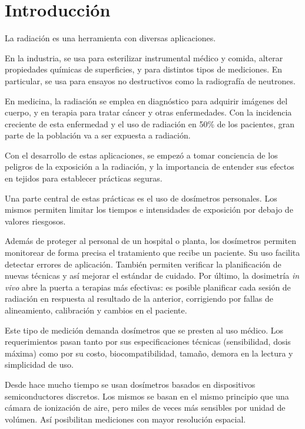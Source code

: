 \section{Introducción}
La radiación es una herramienta con diversas aplicaciones.

En la industria, se usa para esterilizar instrumental médico y comida,
alterar propiedades químicas de superficies\cite{clough2001high},
y para distintos tipos de mediciones.
En particular, se usa para ensayos no destructivos
como la radiografía de neutrones\cite{berger_neutron_1960}.

En medicina, la radiación se emplea en diagnóstico para adquirir imágenes del cuerpo,
y en terapia para tratar cáncer y otras enfermedades.
Con la incidencia creciente de esta enfermedad 
y el uso de radiación en 50\% de los
pacientes\cite{symposium_assurance_dosimetry_1994},
gran parte de la población va a ser expuesta a radiación.

Con el desarrollo de estas aplicaciones,
se empezó a tomar conciencia de 
los peligros de la exposición a la radiación,
y la importancia de entender sus efectos en tejidos
para establecer prácticas seguras.

Una parte central de estas prácticas es el uso de dosímetros personales.
Los mismos permiten limitar los tiempos e intensidades de exposición
por debajo de valores riesgosos.

Además de proteger al personal de un hospital o planta,
los dosímetros permiten monitorear de forma precisa 
el tratamiento que recibe un paciente.
Su uso facilita detectar errores de aplicación\cite{noel_detection_1995}.
También permiten verificar la planificación de nuevas
técnicas y así mejorar el estándar de cuidado\cite{essers_vivo_1999}.
Por último, la dosimetría \emph{in vivo} 
abre la puerta a terapias más efectivas:
es posible planificar cada sesión de radiación
en respuesta al resultado de la anterior,
corrigiendo por fallas de alineamiento, calibración 
y cambios en el paciente\cite{wu_application_2006}.

Este tipo de medición demanda dosímetros 
que se presten al uso médico.
Los requerimientos pasan tanto por sus especificaciones técnicas
(sensibilidad, dosis máxima)
como por su costo,
biocompatibilidad, tamaño,
demora en la lectura y simplicidad de uso.

Desde hace mucho tiempo se usan dosímetros basados en 
dispositivos semiconductores discretos.
Los mismos se basan en el mismo principio que una cámara de ionización de aire,
pero miles de veces más sensibles por unidad de volúmen\cite{jones_application_1963}.
Así posibilitan mediciones con mayor resolución espacial.

